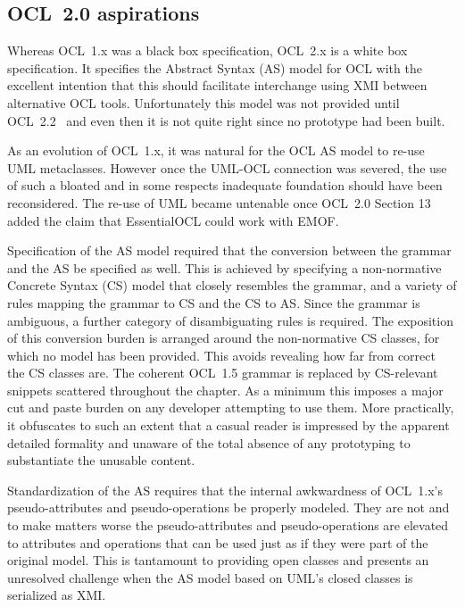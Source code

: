 \documentclass{jot}
\begin{document}
\subsection{OCL~2.0 aspirations}\label{OCL~2.0 aspirations}

Whereas OCL~1.x was a black box specification, OCL~2.x is a white box specification. It specifies the Abstract Syntax (AS) model for OCL with the excellent intention that this should facilitate interchange using XMI between alternative OCL tools. Unfortunately this model was not provided until OCL~2.2~\cite{OCL-2.2} and even then it is not quite right since no prototype had been built.

As an evolution of OCL~1.x, it was natural for the OCL AS model to re-use UML metaclasses. However once the UML-OCL connection was severed, the use of such a bloated and in some respects inadequate foundation should have been reconsidered. The re-use of UML became untenable once OCL~2.0 Section 13 added the claim that EssentialOCL could work with EMOF.

Specification of the AS model required that the conversion between the grammar and the AS be specified as well. This is achieved by specifying a non-normative Concrete Syntax (CS) model that closely resembles the grammar, and a variety of rules mapping the grammar to CS and the CS to AS. Since the grammar is ambiguous, a further category of disambiguating rules is required. The exposition of this conversion burden is arranged around the non-normative CS classes, for which no model has been provided. This avoids revealing how far from correct the CS classes are. The coherent OCL~1.5 grammar is replaced by CS-relevant snippets scattered throughout the chapter. As a minimum this imposes a major cut and paste burden on any developer attempting to use them. More practically, it obfuscates to such an extent that a casual reader is impressed by the apparent detailed formality and unaware of the total absence of any prototyping to substantiate the unusable content.

Standardization of the AS requires that the internal awkwardness of OCL~1.x's pseudo-attributes and pseudo-operations be properly modeled. They are not and to make matters worse the pseudo-attributes and pseudo-operations are elevated to attributes and operations that can be used just as if they were part of the original model. This is tantamount to providing open classes and presents an unresolved challenge when the AS model based on UML's closed classes is serialized as XMI.
\end{document}
